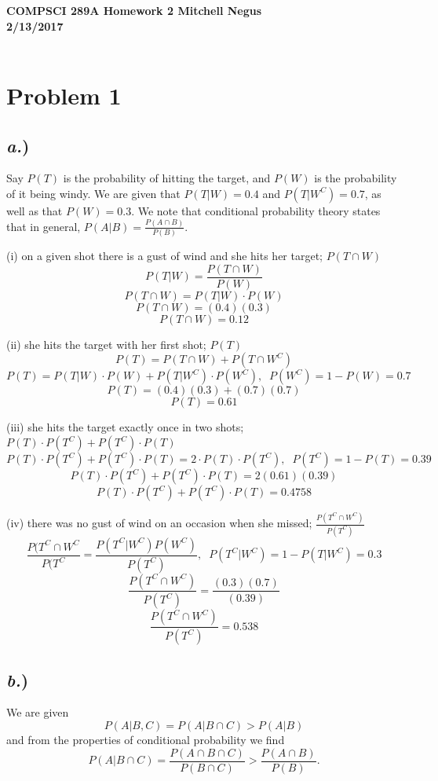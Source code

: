 \documentclass{report}
\begin{document}
{\bf {\large {COMPSCI 289A} Homework {2} \hfill {Mitchell Negus\\2/13/2017}}}\\\\


\section*{Problem 1}

\subsection*{\textit{a.})}

Say $P(T)$ is the probability of hitting the target, and $P(W)$ is the probability of it being windy. We are given that $P(T|W) = 0.4$ and $P(T|W^{C}) = 0.7$, as well as that $P(W) = 0.3$. We note that conditional probability theory states that in general, $P(A|B) = \frac{P(A \cap B)}{P(B)}$.

(i) on a given shot there is a gust of wind and she hits her target; $P(T \cap W)$\\
	$$ P(T|W) = \frac{P(T \cap W)}{P(W)} $$
	$$ P(T \cap W) = P(T|W) \cdot P(W) $$
	$$ P(T \cap W) = (0.4)(0.3) $$
	$$\boxed{ P(T \cap W) = 0.12 } $$
	
(ii) she hits the target with her first shot; $P(T)$\\
	$$ P(T) = P(T \cap W) + P(T \cap W^{C}) $$
	$$ P(T) = P(T|W) \cdot P(W) + P(T|W^{C}) \cdot P(W^{C}), \;\; P(W^{C}) = 1-P(W) = 0.7$$
	$$ P(T) = (0.4)(0.3) + (0.7)(0.7) $$
	$$\boxed{ P(T) = 0.61 }$$

(iii) she hits the target exactly once in two shots; $P(T) \cdot P(T^{C}) + P(T^{C}) \cdot P(T)$
	$$ P(T) \cdot P(T^{C}) + P(T^{C}) \cdot P(T) = 2 \cdot P(T) \cdot P(T^{C}), \;\; P(T^{C}) = 1-P(T) = 0.39 $$
	$$ P(T) \cdot P(T^{C}) + P(T^{C}) \cdot P(T) = 2(0.61)(0.39) $$
	$$\boxed{ P(T) \cdot P(T^{C}) + P(T^{C}) \cdot P(T) = 0.4758 }$$
	
(iv) there was no gust of wind on an occasion when she missed; $\frac{P(T^{C}\cap W^{C})}{P(T^{C})}$ 
	$$ \frac{P(T^{C} \cap W^{C}}{P(T^{C}} = \frac{P(T^{C}|W^{C})P(W^{C})}{P(T^{C})}, \;\; P(T^{C}|W^{C}) = 1-P(T|W^{C}) = 0.3$$
	$$ \frac{P(T^{C} \cap W^{C})}{P(T^{C})} = \frac{(0.3)(0.7)}{(0.39)}$$
	$$\boxed{ \frac{P(T^{C} \cap W^{C})}{P(T^{C})} = 0.538 }$$
	
\subsection*{\textit{b.})}
We are given $$P(A|B,C) = P(A|B \cap C) > P(A|B)$$
and from the properties of conditional probability we find \begin{equation} P(A|B \cap C) =\frac{P(A \cap B \cap C)}{P(B \cap C)} > \frac{P(A \cap B)}{P(B)}. \label{given}\end{equation}
\end{document}
